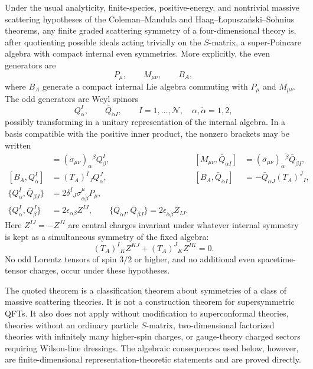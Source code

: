 \begin{quotedtheorem}
\label{qt:hls-four-dimensional-form}
Under the usual analyticity, finite-species, positive-energy, and nontrivial
massive scattering hypotheses of the Coleman--Mandula and
Haag--\L opusza\'nski--Sohnius theorems, any finite graded scattering symmetry
of a four-dimensional theory is, after quotienting possible ideals acting
trivially on the \(S\)-matrix, a super-Poincare algebra with compact internal
even symmetries.  More explicitly, the even generators are
\[
  P_\mu,\qquad M_{\mu\nu},\qquad B_A ,
\]
where \(B_A\) generate a compact internal Lie algebra commuting with
\(P_\mu\) and \(M_{\mu\nu}\).  The odd generators are Weyl spinors
\[
  Q^I_\alpha,\qquad \bar Q_{\dot\alpha I},
  \qquad
  I=1,\ldots,\mathcal N,\quad \alpha,\dot\alpha=1,2,
\]
possibly transforming in a unitary representation of the internal algebra.
In a basis compatible with the positive inner product, the nonzero brackets
may be written
\begin{align}
  [M_{\mu\nu},Q^I_\alpha]
  &=
  (\sigma_{\mu\nu})_\alpha{}^\beta Q^I_\beta,
  &
  [M_{\mu\nu},\bar Q_{\dot\alpha I}]
  &=
  (\bar\sigma_{\mu\nu})_{\dot\alpha}{}^{\dot\beta}
  \bar Q_{\dot\beta I},
  \label{eq:hls-lorentz-action}
  \\
  [B_A,Q^I_\alpha]
  &=
  (T_A)^I{}_J Q^J_\alpha,
  &
  [B_A,\bar Q_{\dot\alpha I}]
  &=
  -\bar Q_{\dot\alpha J}(T_A)^J{}_I,
  \label{eq:hls-internal-action}
  \\
  \{Q^I_\alpha,\bar Q_{\dot\beta J}\}
  &=
  2\delta^I{}_J\sigma^\mu_{\alpha\dot\beta}P_\mu,
  \label{eq:hls-q-qbar}
  \\
  \{Q^I_\alpha,Q^J_\beta\}
  &=
  2\epsilon_{\alpha\beta} Z^{IJ},
  \qquad
  \{\bar Q_{\dot\alpha I},\bar Q_{\dot\beta J}\}
  =
  2\epsilon_{\dot\alpha\dot\beta}\bar Z_{IJ}.
  \label{eq:hls-central-charges}
\end{align}
Here \(Z^{IJ}=-Z^{JI}\) are central charges invariant under whatever internal
symmetry is kept as a simultaneous symmetry of the fixed algebra:
\begin{equation}
  (T_A)^I{}_K Z^{KJ}+(T_A)^J{}_K Z^{IK}=0 .
  \label{eq:hls-central-invariance}
\end{equation}
No odd Lorentz tensors of spin \(3/2\) or higher, and no additional even
spacetime-tensor charges, occur under these hypotheses.
\end{quotedtheorem}

\begin{remark}
\label{rem:hls-status}
The quoted theorem is a classification theorem about symmetries of a class of
massive scattering theories.  It is not a construction theorem for
supersymmetric QFTs.  It also does not apply without modification to
superconformal theories, theories without an ordinary particle \(S\)-matrix,
two-dimensional factorized theories with infinitely many higher-spin charges,
or gauge-theory charged sectors requiring Wilson-line dressings.  The
algebraic consequences used below, however, are finite-dimensional
representation-theoretic statements and are proved directly.
\end{remark}

